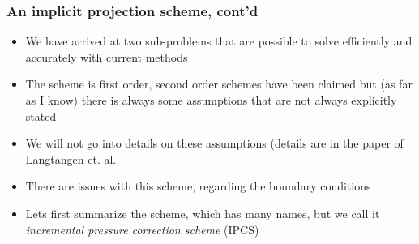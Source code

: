 \begin{frame}
\frametitle{An implicit projection scheme, cont'd}
\begin{itemize}
\item We have arrived at two sub-problems that are possible to solve efficiently and accurately with 
current methods
\item The scheme is first order, second order schemes have been claimed but (as far as I know) 
there is always some assumptions that are not always explicitly stated 
\item We will not go into details on these assumptions (details are in the paper of Langtangen et. al. 
\item There are issues with this scheme, regarding the boundary conditions
\item Lets first summarize the scheme, which has many names, but we call it \emph{incremental pressure correction scheme} (IPCS)  
\end{itemize}
\end{frame}


